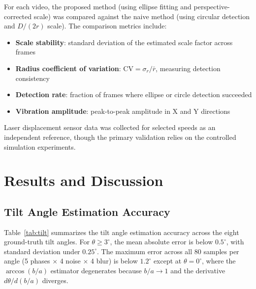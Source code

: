 \documentclass[journal]{IEEEtran}
\begin{document}
For each video, the proposed method (using ellipse fitting and
perspective-corrected scale) was compared against the naive method (using
circular detection and $D/(2r)$ scale). The comparison metrics include:

\begin{itemize}
\item \textbf{Scale stability}: standard deviation of the estimated scale factor
across frames
\item \textbf{Radius coefficient of variation}: $\text{CV} = \sigma_r / \bar{r}$,
measuring detection consistency
\item \textbf{Detection rate}: fraction of frames where ellipse or circle
detection succeeded
\item \textbf{Vibration amplitude}: peak-to-peak amplitude in X and Y directions
\end{itemize}

Laser displacement sensor data was collected for selected speeds as an
independent reference, though the primary validation relies on the controlled
simulation experiments.

\section{Results and Discussion}

\subsection{Tilt Angle Estimation Accuracy}

Table~\ref{tab:tilt} summarizes the tilt angle estimation accuracy across
the eight ground-truth tilt angles. For $\theta \geq 3^{\circ}$, the mean
absolute error is below $0.5^{\circ}$, with standard deviation under
$0.25^{\circ}$. The maximum error across all 80 samples per angle (5 phases
$\times$ 4 noise $\times$ 4 blur) is below $1.2^{\circ}$ except at
$\theta = 0^{\circ}$, where the $\arccos(b/a)$ estimator degenerates because
$b/a \to 1$ and the derivative $d\theta/d(b/a)$ diverges.
\end{document}
